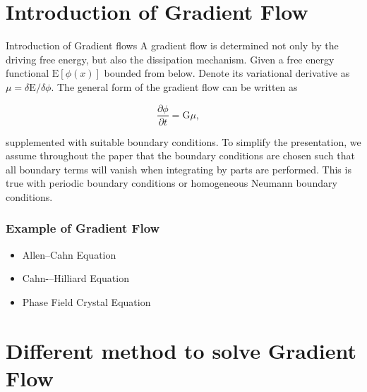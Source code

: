 \documentclass{beamer}
\begin{document}
\section{Introduction of Gradient Flow}
    \begin{frame}{Introduction of Gradient flows}
        A gradient flow is determined not only by the driving free energy, but also the dissipation mechanism. Given a free energy functional $\mathrm{E}[\phi(x)]$ bounded from below. Denote its variational derivative as $\mu=\delta\mathrm{E}/\delta \phi$. The general form of the gradient flow can be written as

\begin{equation}\label{GFlow}
  \frac{\partial\phi}{\partial t} = \mathrm{G}\mu ,\quad
\end{equation}

        supplemented with suitable boundary conditions. To simplify the presentation, we assume throughout the paper that the boundary conditions are chosen such that all boundary terms will vanish when integrating by parts are performed. This is true with periodic boundary conditions or homogeneous Neumann boundary conditions.

    \end{frame}
\begin{frame}
\frametitle{Example of Gradient Flow}
\begin{itemize}
\item Allen--Cahn Equation
\item Cahn-–Hilliard Equation
\item Phase Field Crystal Equation
\end{itemize}
\end{frame}
\section{Different method to solve Gradient Flow}
\end{document}
